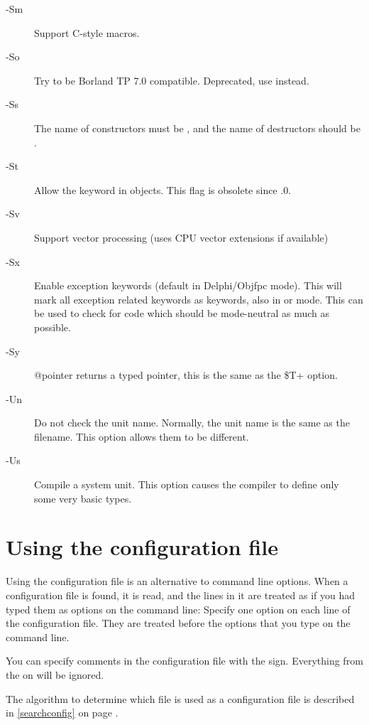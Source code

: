 \begin{description}
\item [-Sm]  Support C-style macros.
\item [-So]  Try to be Borland TP 7.0 compatible. Deprecated, use
 instead.
\item [-Ss]  The name of constructors must be , and the
name of destructors should be .
\item [-St]  Allow the  keyword in objects. This
flag is obsolete since .0.
\item[-Sv] Support vector processing (uses CPU vector extensions if available)
\item [-Sx] Enable exception keywords (default in Delphi/Objfpc mode). This
will mark all exception related keywords as keywords, also in \tp or
 mode. This can be used to check for code which should be
mode-neutral as much as possible.
\item [-Sy]  @pointer returns a typed pointer, this is the same as the \$T+ option.

\item [-Un]  Do not check the unit name. Normally, the unit name
is the same as the filename. This option allows them to be different.
\item [-Us]  Compile a system unit. This option causes the
compiler to define only some very basic types.
\end{description}


\section{Using the configuration file}
\label{se:configfile}
Using the configuration file  is an alternative to command
line options. When a configuration file is found, it is read, and the lines
in it are treated as if you had typed them as options on the command line:
Specify one option on each line of the configuration file. They are treated
before the options that you type on the command line.

You can specify comments in the configuration file with the \var{\#} sign.
Everything from the \var{\#} on will be ignored.

The algorithm to determine which file is used as a configuration file
is described in \ref{searchconfig} on page \pageref{searchconfig}.

